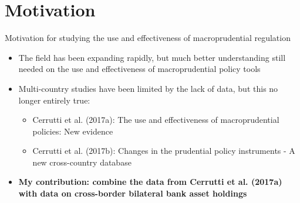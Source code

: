 \documentclass{beamer}
\begin{document}
\section{Motivation}


\begin{frame}{Motivation for studying the use and effectiveness of macroprudential regulation}
\begin{itemize}
\item The field has been expanding rapidly, but much better understanding still needed on the use and effectiveness of macroprudential policy tools
\item Multi-country studies have been limited by the lack of data, but this no longer entirely true: 
\begin{itemize} 
\item Cerrutti et al. (2017a): The use and effectiveness of macroprudential policies: New evidence
\item Cerrutti et al. (2017b): Changes in the prudential policy instruments - A new cross-country database
\end{itemize}
\item \textbf{My contribution: combine the data from Cerrutti et al. (2017a) with data on cross-border bilateral bank asset holdings}
\end{itemize}
\end{frame}
\end{document}
